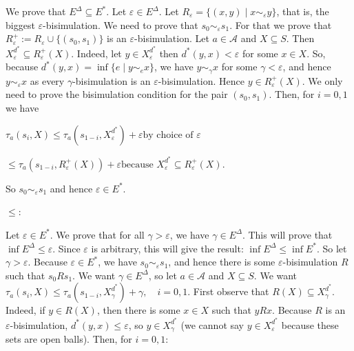We prove that $E^{\Delta}\subseteq E^{*}$. Let $\varepsilon\in E^{\Delta}$. Let $R_{\varepsilon}=\{(x,y)\mid x\sim_{\varepsilon}y\}$, that is, the biggest $\varepsilon$-bisimulation. We need to prove that $s_{0}\sim_{\varepsilon}s_{1}$. For that we prove that $R_{\varepsilon}^{+}:=R_{\varepsilon}\cup\{(s_{0},s_{1})\}$ is an $\varepsilon$-bisimulation. Let $a\in\mathcal{A}$ and $X\subseteq S$. Then $X_{\varepsilon}^{d^{*}}\subseteq R^{+}_{\varepsilon}(X)$. Indeed, let $y\in X_{\varepsilon}^{d^{*}}$ then $d^{*}(y,x)<\varepsilon$ for some $x\in X$. So, because $d^{*}(y,x)=\inf\{e\mid y\sim_{e}x\}$, we have $y\sim_{\gamma}x$ for some $\gamma<\varepsilon$, and hence $y\sim_{\varepsilon}x$ as every $\gamma$-bisimulation is an $\varepsilon$-bisimulation. Hence $y\in R^{+}_{\varepsilon}(X).$ We only need to prove the bisimulation condition for the pair $(s_{0},s_{1})$. Then, for $i=0,1$ we have\par
  
\par  \quad  $\displaystyle\tau_{a}(s_{i},X)$\quad  $\displaystyle\leq\tau_{a}(s_{1-i},X_{\varepsilon}^{d^{*}})+\varepsilon$\quad  $\displaystyle\mbox{by choice of }\varepsilon$\quad  \quad  
 
\par  \quad  \quad  $\displaystyle\leq\tau_{a}(s_{1-i},R^{+}_{\varepsilon}(X))+\varepsilon$\quad  $\displaystyle\mbox{because }X_{\varepsilon}^{d^{*}}\subseteq R^{+}_{\varepsilon}(X).$\quad  \quad  
  
So $s_{0}\sim_{\varepsilon}s_{1}$ and hence $\varepsilon\in E^{*}$.\par
 
  $\leq$:  
 
Let $\varepsilon\in E^{*}$. We prove that for all $\gamma>\varepsilon$, we have $\gamma\in E^{\Delta}$. This will prove that $\inf E^{\Delta}\leq\varepsilon$. Since $\varepsilon$ is arbitrary, this will give the result: $\inf E^{\Delta}\leq\inf E^{*}$. So let $\gamma>\varepsilon$. Because $\varepsilon\in E^{*}$, we have $s_{0}\sim_{\varepsilon}s_{1}$, and hence there is some $\varepsilon$-bisimulation $R$ such that $s_{0}Rs_{1}$. We want $\gamma\in E^{\Delta}$, so let $a\in\mathcal{A}$ and $X\subseteq S$. We want $\tau_{a}(s_{i},X)\leq\tau_{a}(s_{1-i},X^{d^{*}}_{\gamma})+\gamma,\quad i=0,1$. First observe that $R(X)\subseteq X^{d^{*}}_{\gamma}$. Indeed, if $y\in R(X)$, then there is some $x\in X$ such that $yRx$. Because $R$ is an $\varepsilon$-bisimulation, $d^{*}(y,x)\leq\varepsilon$, so $y\in X^{d^{*}}_{\gamma}$ (we cannot say $y\in X^{d^{*}}_{\varepsilon}$ because these sets are open balls). Then, for $i=0,1$:\par
  
